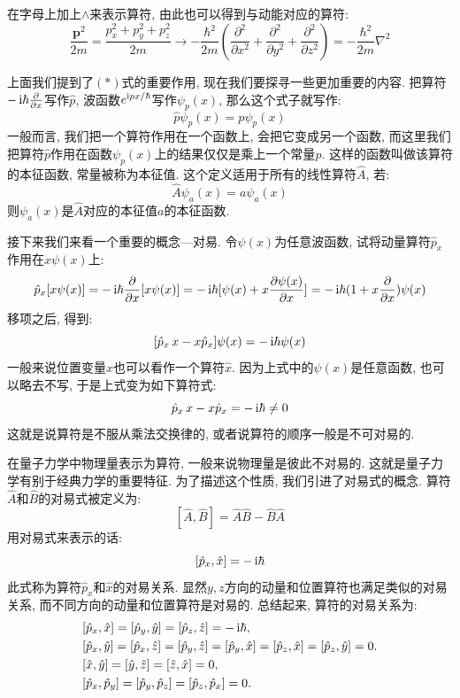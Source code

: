 在字母上加上$\land$来表示算符, 由此也可以得到与动能对应的算符:
\[
\frac{\mathbf{p}^2}{2m} = \frac{p_x^2 + p_y^2 + p_z^2}{2m} \to -\frac{\hbar^2}{2m} \left( \frac{\partial^2}{\partial x^2} + \frac{\partial^2}{\partial y^2} + \frac{\partial^2}{\partial z^2} \right) = -\frac{\hbar^2}{2m} \nabla^2
\]

上面我们提到了$(*)$式的重要作用, 现在我们要探寻一些更加重要的内容. 把算符$-\mathop{}\!\mathrm{i}\hbar\frac{\partial}{\partial x}$写作$\hat{p}$, 波函数$e^{\mathop{}\!\mathrm{i} px/\hbar}$写作$\psi_p(x)$, 那么这个式子就写作:
\[
\hat{p}\psi_p(x) = p\psi_p(x)
\]
一般而言, 我们把一个算符作用在一个函数上, 会把它变成另一个函数, 而这里我们把算符$\hat{p}$作用在函数$\psi_p(x)$上的结果仅仅是乘上一个常量$p$. 这样的函数叫做该算符的本征函数, 常量被称为本征值. 这个定义适用于所有的线性算符$\hat{A}$, 若:
\[
\hat{A}\psi_a(x) = a\psi_a(x)
\]
则$\psi_a(x)$是$\hat{A}$对应的本征值$a$的本征函数.

接下来我们来看一个重要的概念---对易. 令$\psi(x)$为任意波函数, 试将动量算符$\hat{p}_x$作用在$x\psi(x)$上:
\[
\hat{p}_x[x\psi(x)] = -\mathop{}\!\mathrm{i}\hbar\frac{\partial}{\partial x}[x\psi(x)] = -\mathop{}\!\mathrm{i}\hbar[\psi(x)+x\frac{\partial\psi(x)}{\partial x}] = -\mathop{}\!\mathrm{i}\hbar(1+x\frac{\partial}{\partial x})\psi(x)
\]
移项之后, 得到:
\[
[\hat{p}_x\,x-x\hat{p}_x]\psi(x) = -\mathop{}\!\mathrm{i}\hbar\psi(x)
\]
一般来说位置变量$x$也可以看作一个算符$\hat{x}$. 因为上式中的$\psi(x)$是任意函数, 也可以略去不写, 于是上式变为如下算符式:
\[
\hat{p}_x\,x-x\hat{p}_x = -\mathop{}\!\mathrm{i}\hbar \neq 0
\]
这就是说算符是不服从乘法交换律的, 或者说算符的顺序一般是不可对易的.

在量子力学中物理量表示为算符, 一般来说物理量是彼此不对易的. 这就是量子力学有别于经典力学的重要特征. 为了描述这个性质, 我们引进了对易式的概念. 算符$\hat{A}$和$\hat{B}$的对易式被定义为:
\[
[\hat{A}, \hat{B}] = \hat{A}\hat{B}-\hat{B}\hat{A}
\]
用对易式来表示的话:
\[
[\hat{p}_x, \hat{x}] = -\mathop{}\!\mathrm{i}\hbar
\]
此式称为算符$\hat{p}_x$和$\hat{x}$的对易关系. 显然$y, z$方向的动量和位置算符也满足类似的对易关系, 而不同方向的动量和位置算符是对易的. 总结起来, 算符的对易关系为:
\begin{align*}
& [\hat{p}_x, \hat{x}] = [\hat{p}_y, \hat{y}] = [\hat{p}_z, \hat{z}] = -\mathop{}\!\mathrm{i}\hbar, \\
& [\hat{p}_x, \hat{y}] = [\hat{p}_x, \hat{z}] = [\hat{p}_y, \hat{z}] = [\hat{p}_y, \hat{x}] = [\hat{p}_z, \hat{x}] = [\hat{p}_z, \hat{y}] = 0. \\
& [\hat{x}, \hat{y}] = [\hat{y}, \hat{z}] = [\hat{z}, \hat{x}] = 0, \\
& [\hat{p}_x, \hat{p}_y] = [\hat{p}_y, \hat{p}_z] = [\hat{p}_z, \hat{p}_x] = 0.
\end{align*}

